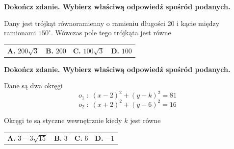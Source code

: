 \documentclass[12pt,a4paper]{article}
\theoremstyle{break}
\begin{document}
	
	\begin{zad}[0-1]
		\textbf{Dokończ zdanie. Wybierz właściwą odpowiedź spośród podanych.}
	\end{zad} 
	
	Dany jest trójkąt równoramienny o ramieniu długości 20 i kącie między ramionami $150^\circ$. Wówczas pole tego trójkąta jest równe
	
	\vspace{0.5cm}
	\begin{tabular}{p{3.5cm} p{3.5cm} p{3.5cm} p{3.5cm}}
		\textbf{A. }$200\sqrt{3}$&
		\textbf{B. }$200$&
		\textbf{C. }$100\sqrt{3}$&
		\textbf{D. }$100$\\
	\end{tabular}

	\begin{zad}[0-1]
		\textbf{Dokończ zdanie. Wybierz właściwą odpowiedź spośród podanych.}
	\end{zad} 
	
	Dane są dwa okręgi
	$$o_1\;:\;(x-2)^2+(y-k)^2=81$$
	$$o_2\;:\;(x+2)^2+(y-6)^2=16$$
	
	Okręgi te są styczne wewnętrznie kiedy $k$ jest równe
	
	\vspace{0.5cm}
	\begin{tabular}{p{3.5cm} p{3.5cm} p{3.5cm} p{3.5cm}}
		\textbf{A. }$3-3\sqrt{15}$&
		\textbf{B. }$3$&
		\textbf{C. }$6$&
		\textbf{D. }$-1$\\
	\end{tabular}
	
	
	
\end{document}
